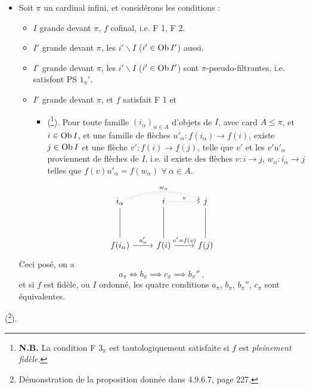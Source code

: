 {\itshape
\begin{itemize}[label={}]
\item[2)] Soit $\pi$ un cardinal infini, et considérons les conditions :
\begin{itemize}[label={}]
\item[$a_\pi$)] $I$ grande devant $\pi$, $f$ cofinal, i.e. F 1, F 2.
\item[$b_\pi$)] $I'$ grande devant $\pi$, les $i'\backslash I$ ($i' \in \operatorname{Ob} I'$) aussi.
\item[$b_\pi{}''$)] $I'$ grande devant $\pi$, les $i'\backslash I$ ($i' \in \operatorname{Ob} I'$) sont $\pi$-pseudo-filtrantes, i.e. satisfont PS $1_\pi{}'$. %
\item[$c_\pi$)] $I'$ grande devant $\pi$, et $f$ satisfait F 1 et
\begin{itemize}[label={}]
\item[\rbox{F $3_\pi$}] \textup{(}\footnote[101]{\textbf{N.B.} La condition F $3_\pi$ est tautologiquement satisfaite si $f$ est \textit{pleinement fidèle.}}\textup{)}. Pour toute famille $(i_\alpha)_{\alpha \in A}$ d'objets de $I$, avec \textup{card} $A \leqslant \pi$, et $i \in \operatorname{Ob} I$, et une famille de flèches $u'_\alpha : f(i_\alpha) \longrightarrow f(i)$, existe $j \in \operatorname{Ob} I$ et une flèche $v' : f(i) \longrightarrow f(j)$, telle que $v'$ \textup{et} les $v'u'_\alpha$ proviennent de flèches de $I$, i.e. il existe des flèches $v : i \longrightarrow j$, $w_\alpha : i_\alpha \longrightarrow j$ telles que $f(v)u'_\alpha = f(w_\alpha)$ $\forall\ \alpha \in A$.
\end{itemize}
\end{itemize}
\[
\begin{tikzcd}[row sep=huge]
i_\alpha \arrow[d, dash] \arrow[rr, dotted, bend left=20, "w_\alpha"] & i \arrow[r, dotted, "v"] \arrow[d, dash] & j \arrow[d, dash] \\
f(i_\alpha) \arrow[r, "u'_\alpha"] & f(i) \arrow[r, "v' = f(v)"] & f(j)
\end{tikzcd}
\]
Ceci posé, on a
\[
a_\pi \iff b_\pi \implies c_\pi \implies b_\pi{}'' \ ,
\]
et si $f$ est fidèle, ou $I$ ordonné, les quatre conditions $a_\pi$, $b_\pi$, $b_\pi{}''$, $c_\pi$ sont équivalentes.
\end{itemize}
}
(\footnote[102]{Démonstration de la proposition donnée dans 4.9.6.7, page 227.}).

